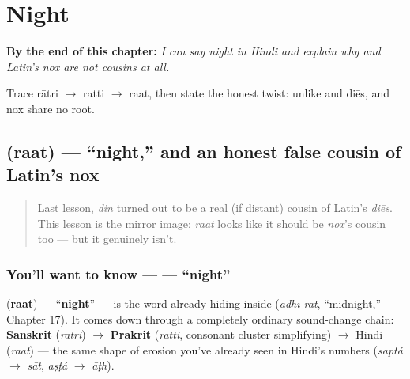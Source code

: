 
\chapter{Night}
\label{ch:hi-night}

\begin{chapteropening}
\textbf{By the end of this chapter:} \emph{I can say night in Hindi and explain why  and Latin's nox are not cousins at all.}

Trace rātri $\to$ ratti $\to$ raat, then state the honest twist: unlike  and diēs,  and nox share no root.
\end{chapteropening}

\section[\texorpdfstring{\hi{रात} (raat)}{रात (raat)}]{ (raat) — \textquotedblleft{}night,\textquotedblright{} and an honest false cousin of Latin's nox}

\label{lesson:HI-C26-raat}



\begin{quote}
Last lesson, \emph{din} turned out to be a real (if distant) cousin of Latin's \emph{diēs}. This lesson is the mirror image: \emph{raat} looks like it should be \emph{nox}'s cousin too — but it genuinely isn't.
\end{quote}

\subsection*{You'll want to know —  — \textquotedblleft{}night\textquotedblright{}}
\textbf{} (\textbf{raat}) — \textquotedblleft{}\textbf{night}\textquotedblright{} — is the word already hiding inside \textbf{ } (\emph{ādhī rāt}, \textquotedblleft{}midnight,\textquotedblright{} Chapter 17). It comes down through a completely ordinary sound-change chain: \textbf{Sanskrit} \textbf{} (\emph{rātri}) $\to$ \textbf{Prakrit} \textbf{} (\emph{ratti}, consonant cluster simplifying) $\to$ Hindi \textbf{} (\emph{raat}) — the same shape of erosion you've already seen in Hindi's numbers (\emph{saptá} $\to$ \emph{sāt}, \emph{aṣṭá} $\to$ \emph{āṭh}).

